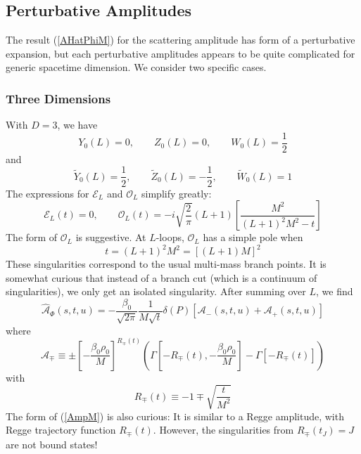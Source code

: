 \subsection{Perturbative Amplitudes}
The result (\ref{AHatPhiM}) for the scattering amplitude has form of a perturbative expansion, but each perturbative amplitudes appears to be quite complicated for generic spacetime dimension. We consider two specific cases.
\subsubsection{Three Dimensions}
With $D = 3$, we have
\begin{equation}
	Y_{0}(L) = 0, \qquad Z_{0}(L) = 0, \qquad W_{0}(L) = \frac{1}{2}
\end{equation}
and
\begin{equation}
	\tilde{Y}_{0}(L) = \frac{1}{2} , \qquad \tilde{Z}_{0}(L) = - \frac{1}{2}, \qquad \tilde{W}_{0}(L) = 1
\end{equation}
The expressions for $\mathcal{E}_{L}$ and $\mathcal{O}_{L}$ simplify greatly:
\begin{equation}
	\mathcal{E}_{L}(t) = 0, \qquad \mathcal{O}_{L}(t) = -i \sqrt{\frac{2}{\pi}} (L+1) \left[ \frac{M^{2}}{(L+1)^{2} M^{2} - t} \right] \label{ELOL3}
\end{equation}
The form of $\mathcal{O}_{L}$ is suggestive. At $L$-loops, $\mathcal{O}_{L}$ has a simple pole when
\begin{equation}
	t = (L+1)^{2} M^{2} = [(L+1) M]^{2}
\end{equation}
These singularities correspond to the usual multi-mass branch points. It is somewhat curious that instead of a branch cut (which is a continuum of singularities), we only get an isolated singularity. After summing over $L$, we find
\begin{equation}
	\widehat{\mathcal{A}}_{\Phi}(s, t, u) = - \frac{\beta_{0}}{\sqrt{2 \pi}} \frac{1}{M \sqrt{t}} \delta(P) \left[ \mathcal{A}_{-}(s, t, u) + \mathcal{A}_{+}(s, t, u) \right]
\end{equation}
where
\begin{equation}
	\mathcal{A}_{\mp} \equiv \pm \left[ - \frac{\beta_{0} \rho_{0}}{M} \right]^{R_{\mp}(t)} \left( \Gamma\left[ - R_{\mp}(t), - \frac{\beta_{0} \rho_{0}}{M} \right] - \Gamma\left[ - R_{\mp}(t) \right] \right) \label{AmpM}
\end{equation}
with
\begin{equation}
	R_{\mp}(t) \equiv -1 \mp \sqrt{\frac{t}{M^{2}}}
\end{equation}
The form of (\ref{AmpM}) is also curious: It is similar to a Regge amplitude, with Regge trajectory function $R_{\mp}(t)$. However, the singularities from $R_{\mp}(t_{J}) = J$ are not bound states!

